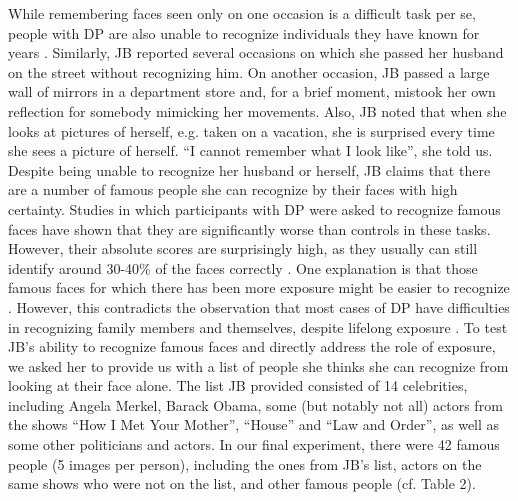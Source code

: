 \documentclass[fleqn,10pt]{SelfArx} %
\begin{document}
While remembering faces seen only on one occasion is a difficult task per se, people with DP are also unable to recognize individuals they have known for years \citep{Ariel_1996, Nunn_2001, Jones_2001, Fine_2011}. Similarly, JB reported several occasions on which she passed her husband on the street without recognizing him. On another occasion, JB passed a large wall of mirrors in a department store and, for a brief moment, mistook her own reflection for somebody mimicking her movements. Also, JB noted that when she looks at pictures of herself, e.g. taken on a vacation, she is surprised every time she sees a picture of herself. “I cannot remember what I look like”, she told us.
Despite being unable to recognize her husband or herself, JB claims that there are a number of famous people she can recognize by their faces with high certainty. Studies in which participants with DP were asked to recognize famous faces have shown that they are significantly worse than controls in these tasks. However, their absolute scores are surprisingly high, as they usually can still identify around 30-40\% of the faces correctly \citep{Rivolta_2012, Garrido_2009}. One explanation is that those famous faces for which there has been more exposure might be easier to recognize \citep{Rivolta_2012}. However, this contradicts the observation that most cases of DP have difficulties in recognizing family members and themselves, despite lifelong exposure \citep{Sacks, Nunn_2001, Fine_2011, Duchaine_2011}.
To test JB's ability to recognize famous faces and directly address the role of exposure, we asked her to provide us with a list of people she thinks she can recognize from looking at their face alone. The list JB provided consisted of 14 celebrities, including Angela Merkel, Barack Obama, some (but notably not all) actors from the shows “How I Met Your Mother”, “House” and “Law and Order”, as well as some other politicians and actors. In our final experiment, there were 42 famous people (5 images per person), including the ones from JB's list, actors on the same shows who were not on the list, and other famous people (cf. Table 2). 
\end{document}
